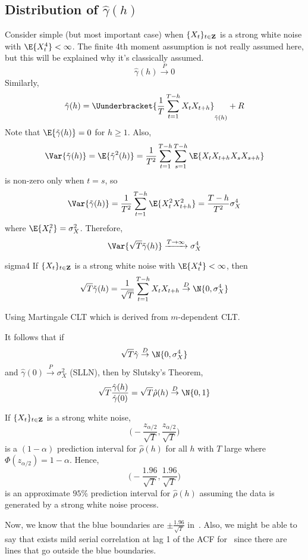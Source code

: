 \subsection*{Distribution of $ \hat{\gamma}(h) $}
Consider simple (but most important case) when $ \{X_t\}_{t\in\mathbf{Z}} $
is a strong white noise with $ \E{X_t^4}<\infty $. The finite
4th moment assumption is not really assumed here, but this will
be explained why it's classically assumed.
\[ \hat{\gamma}(h)\stackrel{P}{\to}0 \]
Similarly,
\[ \hat{\gamma}(h)=\Uunderbracket{\frac{1}{T}\sum_{t=1}^{T-h}X_t X_{t+h}}_{\tilde{\gamma}(h)}+R   \]
Note that $ \E{\tilde{\gamma}(h)}=0 $ for $ h\ge 1 $. Also,
\[ \Var{\tilde{\gamma}(h)}=\E{\tilde{\gamma}^2(h)}=
    \frac{1}{T^2}\sum_{t=1}^{T-h} \sum_{s=1}^{T-h}
    \E{X_t X_{t+h}X_s X_{s+h}} \]
is non-zero only when $ t=s $, so
\[ \Var{\tilde{\gamma}(h)}=\frac{1}{T^2} \sum_{t=1}^{T-h} \E{X_t^2 X_{t+h}^2}=
    \frac{T-h}{T^2} \sigma_X^4 \]
where $ \E{X_t^2}=\sigma_X^2 $. Therefore,
\[ \Var{\sqrt{T}\tilde{\gamma}(h)}
    \xrightarrow{T\to\infty}\sigma_X^4 \]
\begin{Theorem}{}{sigma4}
    If $ \{X_t\}_{t\in\mathbf{Z}} $ is a strong white noise
    with $ \E{X_t^4}<\infty $, then
    \[ \sqrt{T}\tilde{\gamma}(h)=\frac{1}{\sqrt{T}} \sum_{t=1}^{T-h} X_t X_{t+h}
        \stackrel{D}{\to}\N{0,\sigma_X^4} \]
\end{Theorem}
\begin{Proof}{}{}
    Using Martingale CLT which is derived from $ m $-dependent CLT.\@
\end{Proof}
\begin{Corollary}{}{}
    It follows that if
    \[ \sqrt{T}\hat{\gamma}\stackrel{D}{\to}\N{0,\sigma_X^4} \]
    and $ \hat{\gamma}(0)\stackrel{P}{\to}\sigma_X^2 $ (SLLN), then by Slutsky's Theorem,
    \[ \sqrt{T}\frac{\hat{\gamma}(h)}{\hat{\gamma}(0)}=
        \sqrt{T}\hat{\rho}(h)\stackrel{D}{\to}\N{0,1}  \]
\end{Corollary}
If $ \{X_t\}_{t\in\mathbf{Z}} $ is a strong white noise,
\[ \biggl(-\frac{z_{\alpha/2}}{\sqrt{T}} ,\frac{z_{\alpha/2}}{\sqrt{T}} \biggr) \]
is a $ (1-\alpha) $ prediction interval for $ \hat{\rho}(h) $
for all $ h $ with $ T $ large where $ \Phi(z_{\alpha/2})=1-\alpha $. Hence,
\[ \biggl(-\frac{1.96}{\sqrt{T}},\frac{1.96}{\sqrt{T}} \biggr) \]
is an approximate $ 95\% $ prediction interval for $ \hat{\rho}(h) $
assuming the data is generated by a strong white noise process.

Now, we know that the blue boundaries are $ \displaystyle \pm \frac{1.96}{\sqrt{T}} $
in~. Also, we might be able to say that
exists mild serial correlation at lag 1 of the ACF for~
since there are lines that go outside the blue boundaries.

